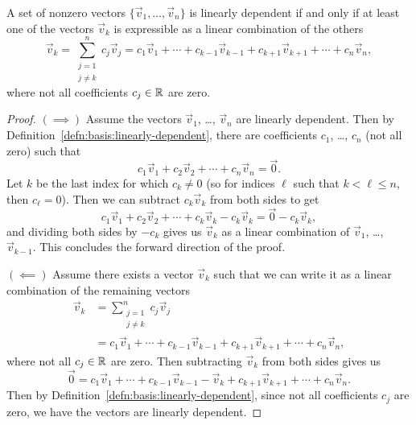 \begin{theorem}
A set of nonzero vectors $\{\vec{v}_{1},\dots,\vec{v}_{n}\}$ is linearly
dependent if and only if at least one of the vectors $\vec{v}_{k}$ is
expressible as a linear combination of the others
\begin{equation}
\vec{v}_{k} = \sum^{n}_{\substack{j=1\\j\neq k}}c_{j}\vec{v}_{j} =c_{1}\vec{v}_{1} + \cdots + c_{k-1}\vec{v}_{k-1} + c_{k+1}\vec{v}_{k+1} +
  \cdots + c_{n}\vec{v}_{n},
\end{equation}
where not all coefficients $c_{j}\in\mathbb{R}$ are zero.
\end{theorem}

\begin{proof}
  $(\implies)$ Assume the vectors $\vec{v}_{1}$, \dots, $\vec{v}_{n}$
  are linearly dependent. Then by Definition~\ref{defn:basis:linearly-dependent},
  there are coefficients $c_{1}$, \dots, $c_{n}$ (not all zero) such that
\begin{equation}
c_{1}\vec{v}_{1} + c_{2}\vec{v}_{2}+\cdots+c_{n}\vec{v}_{n}=\vec{0}.
\end{equation}
Let $k$ be the last index for which $c_{k}\neq0$ (so for indices $\ell$
such that  $k<\ell\leq n$, then $c_{\ell}=0$). Then we can subtract
$c_{k}\vec{v}_{k}$ from both sides to get
\begin{equation}
c_{1}\vec{v}_{1} + c_{2}\vec{v}_{2}+\cdots+c_{k}\vec{v}_{k}-c_{k}\vec{v}_{k}=\vec{0}-c_{k}\vec{v}_{k},
\end{equation}
and dividing both sides by $-c_{k}$ gives us $\vec{v}_{k}$ as a linear
combination of $\vec{v}_{1}$, \dots, $\vec{v}_{k-1}$. This concludes the
forward direction of the proof.
  
  $(\impliedby)$ Assume there exists a vector $\vec{v}_{k}$ such that we
  can write it as a linear combination of the remaining vectors
\begin{equation}
\begin{split}
  \vec{v}_{k} &= \sum^{n}_{\substack{j=1\\j\neq k}}c_{j}\vec{v}_{j}\\
  &=c_{1}\vec{v}_{1} + \cdots + c_{k-1}\vec{v}_{k-1} + c_{k+1}\vec{v}_{k+1} +
  \cdots + c_{n}\vec{v}_{n},
\end{split}
\end{equation}
where not all $c_{j}\in\mathbb{R}$ are zero. Then subtracting $\vec{v}_{k}$
from both sides gives us
\begin{equation}
\vec{0} = c_{1}\vec{v}_{1} + \cdots + c_{k-1}\vec{v}_{k-1} - \vec{v}_{k} + c_{k+1}\vec{v}_{k+1} +
  \cdots + c_{n}\vec{v}_{n}.
\end{equation}
Then by Definition~\ref{defn:basis:linearly-dependent}, since not all
coefficients $c_{j}$ are zero, we have the vectors are linearly dependent.
\end{proof}

